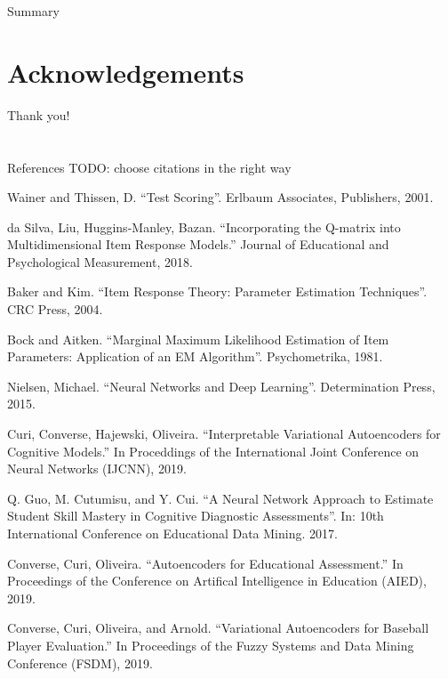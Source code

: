 \documentclass{beamer}
\theoremstyle{definition}
\begin{document}
\begin{frame}{Summary}
  
\end{frame}

\section*{Acknowledgements}
\begin{frame}{Thank you!}
  
\end{frame}

\section{}
\begin{frame}{References}
    TODO: choose citations in the right way %
\begin{thebibliography}{2}
\tiny

 Wainer and Thissen, D. ``Test Scoring''. Erlbaum Associates, Publishers, 2001.

 da Silva, Liu, Huggins-Manley, Bazan. ``Incorporating the Q-matrix into Multidimensional Item Response Models.'' Journal of Educational and Psychological Measurement, 2018.

 Baker and Kim. ``Item Response Theory: Parameter Estimation Techniques''. CRC Press, 2004.

 Bock and Aitken. ``Marginal Maximum Likelihood Estimation of Item Parameters: Application of an EM Algorithm''. Psychometrika, 1981.

 Nielsen, Michael. ``Neural Networks and Deep Learning''. Determination Press, 2015.

 Curi, Converse, Hajewski, Oliveira. ``Interpretable Variational Autoencoders for Cognitive Models.'' In Proceddings of the International Joint Conference on Neural Networks (IJCNN), 2019.

 Q. Guo, M. Cutumisu, and Y. Cui. ``A Neural Network Approach to Estimate Student Skill Mastery in Cognitive Diagnostic Assessments''. In: 10th International Conference on Educational Data Mining. 2017.

 Converse, Curi, Oliveira. ``Autoencoders for Educational Assessment.'' In Proceedings of the Conference on Artifical Intelligence in Education (AIED), 2019.

 Converse, Curi, Oliveira, and Arnold. ``Variational Autoencoders for Baseball Player Evaluation.'' In Proceedings of the Fuzzy Systems and Data Mining Conference (FSDM), 2019.  


\end{thebibliography}
\end{frame}

\begin{frame}
  \titlepage
\end{frame}
\end{document}
